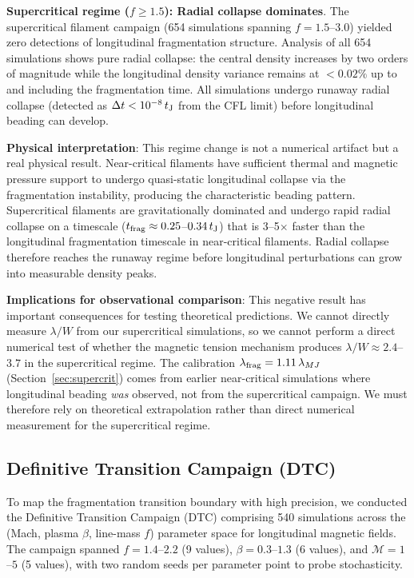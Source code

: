 \documentclass[twocolumn,longtitle,usenatbib]{mnras}
\begin{document}
\textbf{Supercritical regime ($f \geq 1.5$): Radial collapse dominates}. The supercritical filament campaign (654 simulations spanning $f = 1.5$--$3.0$) yielded zero detections of longitudinal fragmentation structure. Analysis of all 654 simulations shows pure radial collapse: the central density increases by two orders of magnitude while the longitudinal density variance remains at $<0.02\%$ up to and including the fragmentation time. All simulations undergo runaway radial collapse (detected as $\Delta t < 10^{-8}\,t_{\rm J}$ from the CFL limit) before longitudinal beading can develop.

\textbf{Physical interpretation}: This regime change is not a numerical artifact but a real physical result. Near-critical filaments have sufficient thermal and magnetic pressure support to undergo quasi-static longitudinal collapse via the fragmentation instability, producing the characteristic beading pattern. Supercritical filaments are gravitationally dominated and undergo rapid radial collapse on a timescale ($t_{\rm frag} \approx 0.25$--$0.34\,t_{\rm J}$) that is 3--5$\times$ faster than the longitudinal fragmentation timescale in near-critical filaments. Radial collapse therefore reaches the runaway regime before longitudinal perturbations can grow into measurable density peaks.

\textbf{Implications for observational comparison}: This negative result has important consequences for testing theoretical predictions. We cannot directly measure $\lambda/W$ from our supercritical simulations, so we cannot perform a direct numerical test of whether the magnetic tension mechanism produces $\lambda/W \approx 2.4$--$3.7$ in the supercritical regime. The calibration $\lambda_{\rm frag} = 1.11\,\lambda_{MJ}$ (Section~\ref{sec:supercrit}) comes from earlier near-critical simulations where longitudinal beading \textit{was} observed, not from the supercritical campaign. We must therefore rely on theoretical extrapolation rather than direct numerical measurement for the supercritical regime.

\subsection{Definitive Transition Campaign (DTC)}
\label{sec:dtc}

To map the fragmentation transition boundary with high precision, we conducted the Definitive Transition Campaign (DTC) comprising 540 simulations across the (Mach, plasma $\beta$, line-mass $f$) parameter space for longitudinal magnetic fields. The campaign spanned $f = 1.4$--$2.2$ (9 values), $\beta = 0.3$--$1.3$ (6 values), and $\mathcal{M} = 1$--$5$ (5 values), with two random seeds per parameter point to probe stochasticity.
\end{document}
